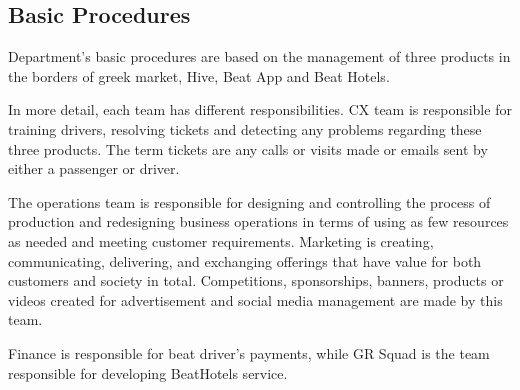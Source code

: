 \subsection{Basic Procedures}
Department's basic procedures are based on the management of three products in the borders of greek market, Hive, Beat App and Beat Hotels.\par
In more detail, each team has different responsibilities. CX team is responsible for training drivers, resolving tickets and detecting any problems regarding these three products. The term tickets are any calls or visits made or emails sent by either a passenger or driver.\par 
The operations team is responsible for designing and controlling the process of production and redesigning business operations in terms of using as few resources as needed and meeting customer requirements. 
Marketing is creating, communicating, delivering, and exchanging offerings that have value for both customers and society in total. Competitions, sponsorships, banners, products or videos created for advertisement and social media management are made by this team.\par
Finance is responsible for beat driver's payments, while GR Squad is the team responsible for developing BeatHotels service.

